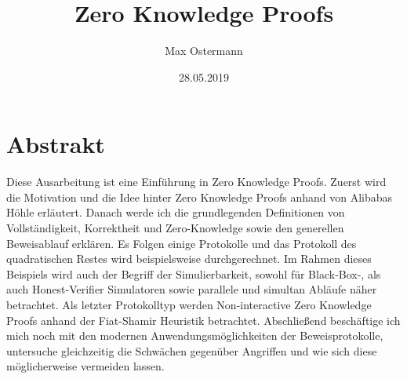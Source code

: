 \documentclass {article}
\title{Zero Knowledge Proofs}
\author{Max Ostermann}
\date{28.05.2019}
\begin{document}
\maketitle
{}
\newpage
{}

\section{Abstrakt}
Diese Ausarbeitung ist eine Einführung in Zero Knowledge Proofs.
Zuerst wird die Motivation und die Idee hinter Zero Knowledge Proofs anhand von Alibabas Höhle erläutert. Danach werde ich die grundlegenden Definitionen von Vollständigkeit, Korrektheit und Zero-Knowledge sowie den generellen Beweisablauf erklären.
Es Folgen einige Protokolle und das Protokoll des quadratischen Restes wird beispielsweise durchgerechnet. Im Rahmen dieses Beispiels wird auch der Begriff der Simulierbarkeit, sowohl für Black-Box-, als auch Honest-Verifier Simulatoren sowie parallele und simultan Abläufe näher betrachtet. Als letzter Protokolltyp werden Non-interactive Zero Knowledge Proofs anhand der Fiat-Shamir Heuristik betrachtet. Abschließend beschäftige ich mich noch mit den modernen Anwendungsmöglichkeiten der Beweisprotokolle, untersuche gleichzeitig die Schwächen gegenüber Angriffen und wie sich diese möglicherweise vermeiden lassen.
\end{document}
